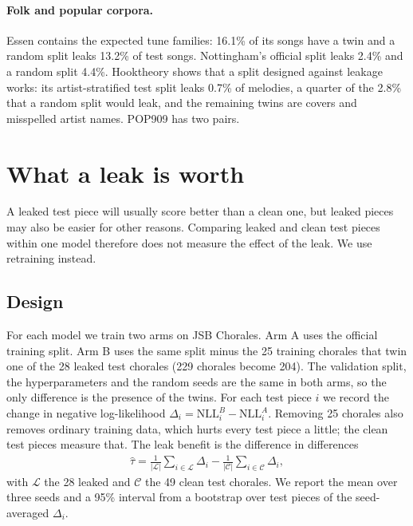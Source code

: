 \documentclass[ProofPDF]{./Styles/Jnls-Template-V3}
\begin{document}
\paragraph{Folk and popular corpora.} Essen contains the expected tune families: 16.1\% of its songs have a twin and a random split leaks 13.2\% of test songs. Nottingham's official split leaks 2.4\% and a random split 4.4\%. Hooktheory shows that a split designed against leakage works: its artist-stratified test split leaks 0.7\% of melodies, a quarter of the 2.8\% that a random split would leak, and the remaining twins are covers and misspelled artist names. POP909 has two pairs.

\section{What a leak is worth}\label{sec:counterfactual}

A leaked test piece will usually score better than a clean one, but leaked pieces may also be easier for other reasons. Comparing leaked and clean test pieces within one model therefore does not measure the effect of the leak. We use retraining instead.

\subsection{Design}
For each model we train two arms on JSB Chorales. Arm A uses the official training split. Arm B uses the same split minus the 25 training chorales that twin one of the 28 leaked test chorales (229 chorales become 204). The validation split, the hyperparameters and the random seeds are the same in both arms, so the only difference is the presence of the twins. For each test piece $i$ we record the change in negative log-likelihood $\Delta_i = \mathrm{NLL}_i^{B} - \mathrm{NLL}_i^{A}$. Removing 25 chorales also removes ordinary training data, which hurts every test piece a little; the clean test pieces measure that. The leak benefit is the difference in differences \citep{angrist2009mostly}
\begin{align}\label{eq:did}
\hat{\tau} = \frac{1}{|\mathcal{L}|}\sum_{i \in \mathcal{L}} \Delta_i - \frac{1}{|\mathcal{C}|}\sum_{i \in \mathcal{C}} \Delta_i,
\end{align}
with $\mathcal{L}$ the 28 leaked and $\mathcal{C}$ the 49 clean test chorales. We report the mean over three seeds and a 95\% interval from a bootstrap over test pieces of the seed-averaged $\Delta_i$.
\end{document}
